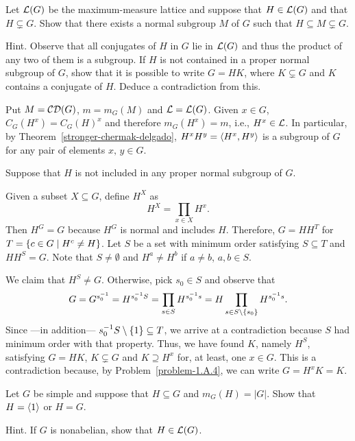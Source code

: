 \begin{probl}\label{problem-1.G.2}
    Let\/ ${\cal L}(G)$ be the maximum-measure lattice and suppose that\/ $H \in{\cal L}(G)$ and that\/ $H\varsubsetneq G$. Show that there exists a normal subgroup\/ $M$ of\/ $G$ such that\/ $H \subseteq M \varsubsetneq G$.

    \textrm{\rm Hint. Observe that all conjugates of $H$ in $G$ lie in ${\cal L}(G)$ and thus the product of any two of them is a subgroup. If $H$ is not contained in a proper normal subgroup of $G$, show that it is possible to write $G=HK$, where $K\varsubsetneq G$ and $K$ contains a conjugate of $H$. Deduce a contradiction from this.}
\end{probl}

\begin{solution} Put $M=\operatorname{{\cal CD}}(G)$, $m=m_G(M)$ and ${\cal L}={\cal L}(G)$. Given $x\in G$, $C_G(H^x)=C_G(H)^x$ and therefore $m_G(H^x)=m$, i.e., $H^x\in\cal L$. In particular, by Theorem~\ref{stronger-chermak-delgado}, $H^xH^y = \langle H^x,H^y\rangle$ is a subgroup of $G$ for any pair of elements $x,\,y\in G$.

Suppose that $H$ is not included in any proper normal subgroup of $G$.

Given a subset $X\subseteq G$, define $H^X$ as 
$$
    H^X = \prod_{x\in X}H^x.
$$
Then $H^G=G$ because $H^G$ is normal and includes $H$. Therefore, $G=HH^T$ for $T=\{c\in G\mid H^c\ne H\}$. Let $S$ be a set with minimum order satisfying $S\subseteq T$ and $HH^S=G$. Note that $S\ne\emptyset$ and $H^a\ne H^b$ if $a\ne b$, $a,b\in S$. 

We claim that $H^S\ne G$. Otherwise, pick $s_0\in S$ and observe that
$$
    G = G^{s_0^{-1}} = H^{s_0^{-1}S} = \prod_{s\in S}H^{s_0^{-1}s}
        =H\prod_{s\in S\setminus\{s_0\}}H^{s_0^{-1}s}.
$$
Since ---in addition--- $s_0^{-1}S\setminus\{1\}\subseteq T$, we arrive at a contradiction because $S$ had minimum order with that property. Thus, we have found $K$, namely $H^S$, satisfying $G=HK$, $K\varsubsetneq G$ and $K\supseteq H^x$ for, at least, one $x\in G$. This is a contradiction because, by Problem~\ref{problem-1.A.4}, we can write $G=H^xK=K$.  \end{solution}

\begin{probl}
    Let\/ $G$ be simple and suppose that\/ $H \subseteq G$ and\/ $m_G(H)=|G|$. Show that $H=\langle1\rangle$ or $H=G$.

    \textrm{\rm Hint. If $G$ is nonabelian, show that $H \in{\cal L}(G)$}.
\end{probl}

